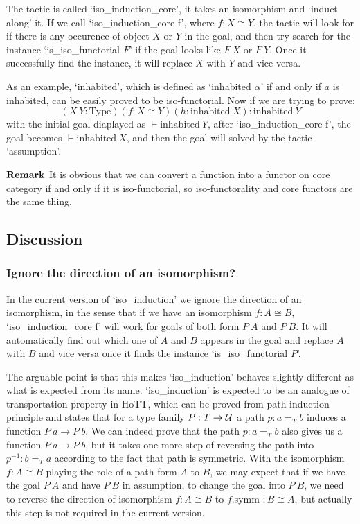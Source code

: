 \documentclass[11pt]{article}
\begin{document}
The tactic is called `iso\_induction\_core', it takes an isomorphism and `induct along' it. If we call `iso\_induction\_core f', where $f:X\cong Y$, the tactic will look for if there is any occurence of object $X$ or $Y$ in the goal, and then try search for the instance `is\_iso\_functorial $F$' if the goal looks like $F \ X$ or $F \ Y$. Once it successfully find the instance, it will replace $X$ with $Y$ and vice versa.

As an example, `inhabited', which is defined as `inhabited $\alpha$' if and only if $a$ is inhabited, can be easily proved to be iso-functorial. Now if we are trying to prove:
\[(X \ Y : \text{Type}) (f : X \cong Y) (h : \text{inhabited} \ X) : \text{inhabited} \ Y\]
with the initial goal diaplayed as $ \vdash \text{inhabited} \ Y$, after `iso\_induction\_core f', the goal becomes $ \vdash \text{inhabited} \ X$, and then the goal will solved by the tactic `assumption'.


$\bf Remark$ It is obvious that we can convert a function into a functor on core category if and only if it is iso-functorial, so iso-functorality and core functors are the same thing.

\subsection{Discussion}

\subsubsection{Ignore the direction of an isomorphism?} 

In the current version of `iso\_induction' we ignore the direction of an isomorphism, in the sense that if we have an isomorphism $f: A\cong B$, `iso\_induction\_core f' will work for goals of both form $P \ A$ and $P \ B$. It will automatically find out which one of $A$ and $B$ appears in the goal and replace $A$ with $B$ and vice versa once it finds the instance `is\_iso\_functorial $P$'. 


The arguable point is that this makes `iso\_induction' behaves slightly different as what is expected from its name. `iso\_induction' is expected to be an analogue of transportation property in HoTT, which can be proved from path induction principle and states that for a type family $P : T \to \cal U$ a path $p:a=_Tb$ induces a function $P \ a \to P \ b$. We can indeed prove that the path $p:a=_Tb$ also gives us a function $P \ a \to P \ b$, but it takes one more step of reversing the path into $p^{-1}: b =_T a$ according to the fact that path is symmetric. With the isomorphism $f: A\cong B$ playing the role of a path form $A$ to $B$, we may expect that if we have the goal $P \ A$ and have $P \ B$ in assumption, to change the goal into $P \ B$, we need to reverse the direction of isomorphism $f:A\cong B$ to $f$.symm $:B\cong A$, but actually this step is not required in the current version.
\end{document}
